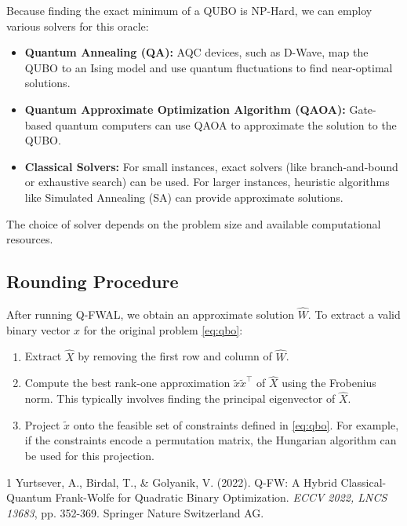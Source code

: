 \documentclass{article}
\begin{document}
Because finding the exact minimum of a QUBO is NP-Hard, we can employ various solvers for this oracle:
\begin{itemize}
    \item \textbf{Quantum Annealing (QA):} AQC devices, such as D-Wave, map the QUBO to an Ising model and use quantum fluctuations to find near-optimal solutions.
    \item \textbf{Quantum Approximate Optimization Algorithm (QAOA):} Gate-based quantum computers can use QAOA to approximate the solution to the QUBO.
    \item \textbf{Classical Solvers:} For small instances, exact solvers (like branch-and-bound or exhaustive search) can be used. For larger instances, heuristic algorithms like Simulated Annealing (SA) can provide approximate solutions.
\end{itemize}
The choice of solver depends on the problem size and available computational resources.

\subsection{Rounding Procedure}

After running Q-FWAL, we obtain an approximate solution $\hat{W}$. To extract a valid binary vector $x$ for the original problem \eqref{eq:qbo}:
\begin{enumerate}
    \item Extract $\hat{X}$ by removing the first row and column of $\hat{W}$.
    \item Compute the best rank-one approximation $\tilde{x}\tilde{x}^\top$ of $\hat{X}$ using the Frobenius norm. This typically involves finding the principal eigenvector of $\hat{X}$.
    \item Project $\tilde{x}$ onto the feasible set of constraints defined in \eqref{eq:qbo}. For example, if the constraints encode a permutation matrix, the Hungarian algorithm can be used for this projection.
\end{enumerate}

\begin{thebibliography}{1}
Yurtsever, A., Birdal, T., \& Golyanik, V. (2022). Q-FW: A Hybrid Classical-Quantum Frank-Wolfe for Quadratic Binary Optimization. \textit{ECCV 2022, LNCS 13683}, pp. 352-369. Springer Nature Switzerland AG.
\end{thebibliography}
\end{document}
